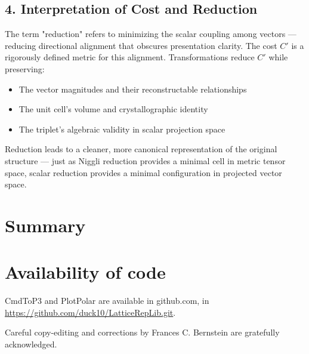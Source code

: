 \documentclass[preprint]{iucr}              %
\numberwithin{equation}{section}
\begin{document}
	\vspace{1em}
	
	\subsection{4. Interpretation of Cost and Reduction}
	
	The term "reduction" refers to minimizing the scalar coupling among vectors — reducing directional alignment that obscures presentation clarity. The cost \( C' \) is a rigorously defined metric for this alignment. Transformations reduce \( C' \) while preserving:
	\begin{itemize}
		\item The vector magnitudes and their reconstructable relationships
		\item The unit cell's volume and crystallographic identity
		\item The triplet’s algebraic validity in scalar projection space
	\end{itemize}
	
	Reduction leads to a cleaner, more canonical representation of the original structure — just as Niggli reduction provides a minimal cell in metric tensor space, scalar reduction provides a minimal configuration in projected vector space.
	
	
	
	
	\section{Summary}
	
	
	
	
	\section{Availability of code} CmdToP3 and PlotPolar are available in github.com, in
	\url{https://github.com/duck10/LatticeRepLib.git}.
	
	
	
	
	Careful copy-editing and corrections by Frances C. Bernstein are 
	gratefully acknowledged.
	
\end{document}
